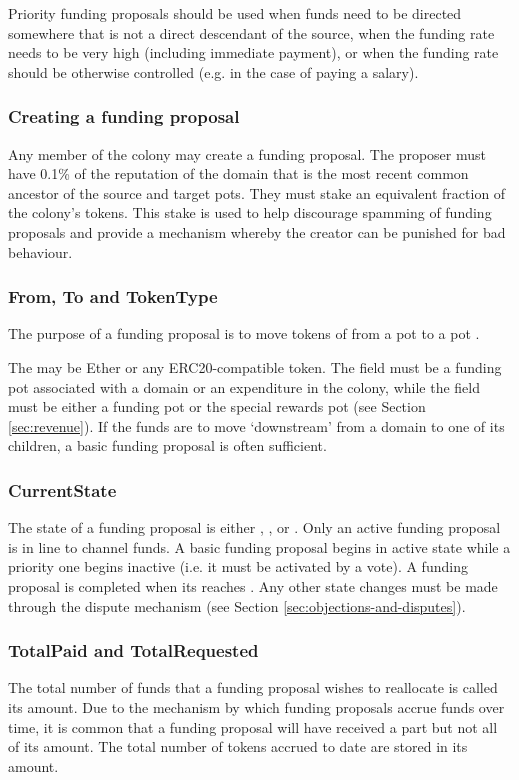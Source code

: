 Priority funding proposals should be used when funds need to be directed somewhere that is not a direct descendant of the source, when the funding rate needs to be very high (including immediate payment), or when the funding rate should be otherwise controlled (e.g. in the case of paying a salary).

\subsubsection{Creating a funding proposal}
Any member of the colony may create a funding proposal. The proposer must have 0.1\% of the reputation of the domain that is the most recent common ancestor of the source and target pots. They must stake an equivalent fraction of the colony's tokens. This stake is used to help discourage spamming of funding proposals and provide a mechanism whereby the creator can be punished for bad behaviour.

\subsubsection{From, To and TokenType}
The purpose of a funding proposal is to move tokens of  from a pot  to a pot .

The  may be Ether or any ERC20-compatible token. The  field must be a funding pot associated with a domain or an expenditure in the colony, while the  field must be either a funding pot or the special rewards pot (see Section \ref{sec:revenue}). If the funds are to move `downstream' from a domain to one of its children, a basic funding proposal is often sufficient.

\subsubsection{CurrentState}
The state of a funding proposal is either , ,  or . Only an active funding proposal is in line to channel funds. A basic funding proposal begins in active state while a priority one begins inactive (i.e. it must be activated by a vote). A funding proposal is completed when its  reaches . Any other state changes must be made through the dispute mechanism (see Section \ref{sec:objections-and-disputes}).

\subsubsection{TotalPaid and TotalRequested}
The total number of funds that a funding proposal wishes to reallocate is called its  amount. Due to the mechanism by which funding proposals accrue funds over time, it is common that a funding proposal will have received a part but not all of its  amount. The total number of tokens accrued to date are stored in its  amount.

